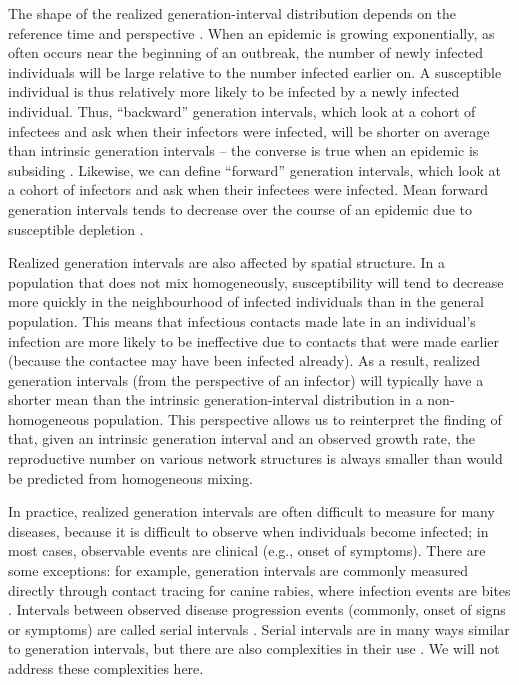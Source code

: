 \documentclass[12pt]{article}
\begin{document}
The shape of the realized generation-interval distribution depends on the reference time and perspective \citep{champredon2015intrinsic,kenah2008generation, nishiura2010time, tomba2010some, britton2019estimation}.
When an epidemic is growing exponentially, as often occurs near the beginning of an outbreak, the number of newly infected individuals will be large relative to the number infected earlier on. 
A susceptible individual is thus relatively more likely to be infected by a newly infected individual. 
Thus, ``backward'' generation intervals, which look at a cohort of infectees and ask when their infectors were infected, will be shorter on average than intrinsic generation intervals -- the converse is true when an epidemic is subsiding \citep{nishiura2010time, champredon2015intrinsic, britton2019estimation}.
Likewise, we can define ``forward'' generation intervals, which look at a cohort of infectors and ask when their infectees were infected.
Mean forward generation intervals tends to decrease over the course of an epidemic due to susceptible depletion \citep{kenah2008generation, nishiura2010time, tomba2010some, champredon2015intrinsic}.

Realized generation intervals are also affected by spatial structure.
In a population that does not mix homogeneously, susceptibility will tend to decrease more quickly in the neighbourhood of infected individuals than in the general population.
This means that infectious contacts made late in an individual's infection are more likely to be ineffective due to contacts that were made earlier (because the contactee may have been infected already).
As a result, realized generation intervals (from the perspective of an infector) will typically have a shorter mean than the intrinsic generation-interval distribution in a non-homogeneous population.
This perspective allows us to reinterpret the finding of \cite{trapman2016inferring} that, given an intrinsic generation interval and an observed growth rate, the reproductive number on various network structures is always smaller than would be predicted from homogeneous mixing.

In practice, realized generation intervals are often difficult to measure for many diseases, because it is difficult to observe when individuals become infected;
in most cases, observable events are clinical (e.g., onset of symptoms).
There are some exceptions: for example, generation intervals are commonly measured directly through contact tracing for canine rabies, where infection events are bites \citep{hampson2009transmission}.
Intervals between observed disease progression events (commonly, onset of signs or symptoms) are called serial intervals \citep{svensson2007note}.
Serial intervals are in many ways similar to generation intervals, but there are also complexities in their use  \citep{britton2019estimation}.
We will not address these complexities here.
\end{document}
